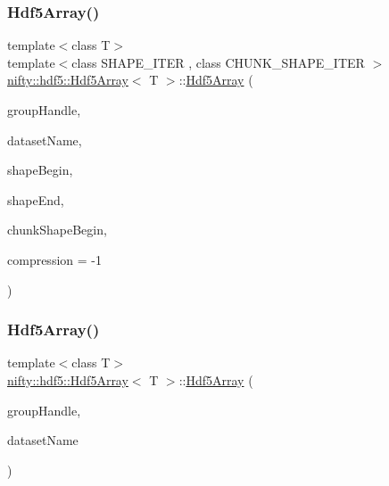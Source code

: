 \subsubsection{\texorpdfstring{Hdf5\+Array()}{Hdf5Array()}\hspace{0.1cm}{\footnotesize\ttfamily [1/2]}}
{\footnotesize\ttfamily template$<$class T$>$ \\
template$<$class S\+H\+A\+P\+E\+\_\+\+I\+T\+ER , class C\+H\+U\+N\+K\+\_\+\+S\+H\+A\+P\+E\+\_\+\+I\+T\+ER $>$ \\
\hyperlink{classnifty_1_1hdf5_1_1Hdf5Array}{nifty\+::hdf5\+::\+Hdf5\+Array}$<$ T $>$\+::\hyperlink{classnifty_1_1hdf5_1_1Hdf5Array}{Hdf5\+Array} (\begin{DoxyParamCaption}\item[{const hid\+\_\+t \&}]{group\+Handle,  }\item[{const std\+::string \&}]{dataset\+Name,  }\item[{S\+H\+A\+P\+E\+\_\+\+I\+T\+ER}]{shape\+Begin,  }\item[{S\+H\+A\+P\+E\+\_\+\+I\+T\+ER}]{shape\+End,  }\item[{C\+H\+U\+N\+K\+\_\+\+S\+H\+A\+P\+E\+\_\+\+I\+T\+ER}]{chunk\+Shape\+Begin,  }\item[{const int}]{compression = {\ttfamily -\/1} }\end{DoxyParamCaption})\hspace{0.3cm}{\ttfamily [inline]}}

\mbox{\label{classnifty_1_1hdf5_1_1Hdf5Array_a8ce039a0d357f3c20a30fa5f6d595cb5}} 
\subsubsection{\texorpdfstring{Hdf5\+Array()}{Hdf5Array()}\hspace{0.1cm}{\footnotesize\ttfamily [2/2]}}
{\footnotesize\ttfamily template$<$class T$>$ \\
\hyperlink{classnifty_1_1hdf5_1_1Hdf5Array}{nifty\+::hdf5\+::\+Hdf5\+Array}$<$ T $>$\+::\hyperlink{classnifty_1_1hdf5_1_1Hdf5Array}{Hdf5\+Array} (\begin{DoxyParamCaption}\item[{const hid\+\_\+t \&}]{group\+Handle,  }\item[{const std\+::string \&}]{dataset\+Name }\end{DoxyParamCaption})\hspace{0.3cm}{\ttfamily [inline]}}

